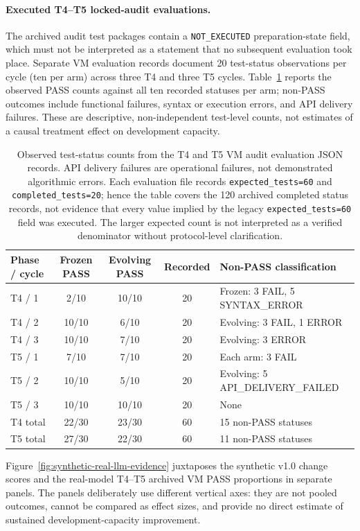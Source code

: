 \documentclass[11pt,a4paper]{article}
\begin{document}
\paragraph{Executed T4--T5 locked-audit evaluations.}
The archived audit test packages contain a \texttt{NOT\_EXECUTED} preparation-state field, which must not be interpreted as a statement that no subsequent evaluation took place. Separate VM evaluation records document 20 test-status observations per cycle (ten per arm) across three T4 and three T5 cycles. Table~\ref{tab:t4t5-audit} reports the observed PASS counts against all ten recorded statuses per arm; non-PASS outcomes include functional failures, syntax or execution errors, and API delivery failures. These are descriptive, non-independent test-level counts, not estimates of a causal treatment effect on development capacity.
\begin{table}[htbp]
\centering\small
\begin{tabular}{lcccl}
\hline
Phase / cycle & Frozen PASS & Evolving PASS & Recorded & Non-PASS classification \\
\hline
T4 / 1 & 2/10 & 10/10 & 20 & Frozen: 3 FAIL, 5 SYNTAX\_ERROR \\
T4 / 2 & 10/10 & 6/10 & 20 & Evolving: 3 FAIL, 1 ERROR \\
T4 / 3 & 10/10 & 7/10 & 20 & Evolving: 3 ERROR \\
T5 / 1 & 7/10 & 7/10 & 20 & Each arm: 3 FAIL \\
T5 / 2 & 10/10 & 5/10 & 20 & Evolving: 5 API\_DELIVERY\_FAILED \\
T5 / 3 & 10/10 & 10/10 & 20 & None \\
\hline
T4 total & 22/30 & 23/30 & 60 & 15 non-PASS statuses \\
T5 total & 27/30 & 22/30 & 60 & 11 non-PASS statuses \\
\hline
\end{tabular}
\caption{Observed test-status counts from the T4 and T5 VM audit evaluation JSON records. API delivery failures are operational failures, not demonstrated algorithmic errors. Each evaluation file records \texttt{expected\_tests=60} and \texttt{completed\_tests=20}; hence the table covers the 120 archived completed status records, not evidence that every value implied by the legacy \texttt{expected\_tests=60} field was executed. The larger expected count is not interpreted as a verified denominator without protocol-level clarification.}\label{tab:t4t5-audit}
\end{table}
Figure~\ref{fig:synthetic-real-llm-evidence} juxtaposes the synthetic v1.0 change scores and the real-model T4--T5 archived VM PASS proportions in separate panels. The panels deliberately use different vertical axes: they are not pooled outcomes, cannot be compared as effect sizes, and provide no direct estimate of sustained development-capacity improvement.
\end{document}
